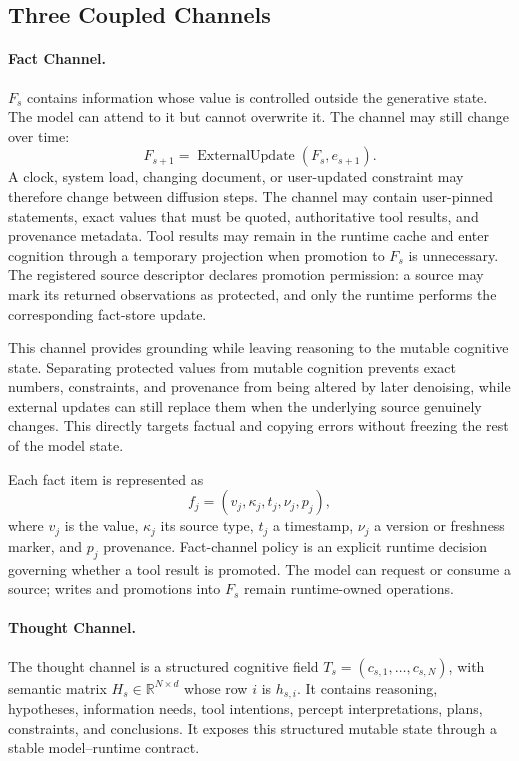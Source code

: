\subsection{Three Coupled Channels}
\label{sec:channels}

\paragraph{Fact Channel.}
$F_s$ contains information whose value is controlled outside the generative state. The model can attend to it but cannot overwrite it. The channel may still change over time:
\begin{equation}
  F_{s+1} = \operatorname{ExternalUpdate}(F_s, e_{s+1}).
  \label{eq:fact-update}
\end{equation}
A clock, system load, changing document, or user-updated constraint may therefore change between diffusion steps. The channel may contain user-pinned statements, exact values that must be quoted, authoritative tool results, and provenance metadata. Tool results may remain in the runtime cache and enter cognition through a temporary projection when promotion to $F_s$ is unnecessary. The registered source descriptor declares promotion permission: a source may mark its returned observations as protected, and only the runtime performs the corresponding fact-store update.

This channel provides grounding while leaving reasoning to the mutable cognitive state. Separating protected values from mutable cognition prevents exact numbers, constraints, and provenance from being altered by later denoising, while external updates can still replace them when the underlying source genuinely changes. This directly targets factual and copying errors without freezing the rest of the model state.

Each fact item is represented as
\begin{equation}
  f_j = (v_j, \kappa_j, t_j, \nu_j, p_j),
\end{equation}
where $v_j$ is the value, $\kappa_j$ its source type, $t_j$ a timestamp, $\nu_j$ a version or freshness marker, and $p_j$ provenance. Fact-channel policy is an explicit runtime decision governing whether a tool result is promoted. The model can request or consume a source; writes and promotions into $F_s$ remain runtime-owned operations.

\paragraph{Thought Channel.}
The thought channel is a structured cognitive field $T_s=(c_{s,1},\ldots,c_{s,N})$, with semantic matrix $H_s\in\mathbb{R}^{N\times d}$ whose row $i$ is $h_{s,i}$. It contains reasoning, hypotheses, information needs, tool intentions, percept interpretations, plans, constraints, and conclusions. It exposes this structured mutable state through a stable model--runtime contract.

